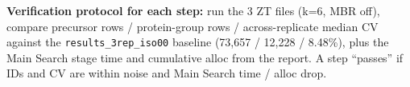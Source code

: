 \documentclass[11pt]{article}
\newcommand{\code}[1]{\texttt{\small #1}}
\begin{document}
\textbf{Verification protocol for each step:} run the 3 ZT files (k=6, MBR off),
compare precursor rows / protein-group rows / across-replicate median CV against the
\code{results\_3rep\_iso00} baseline (73{,}657 / 12{,}228 / 8.48\%), plus the Main
Search stage time and cumulative alloc from the report. A step ``passes'' if IDs and
CV are within noise and Main Search time / alloc drop.
\end{document}
